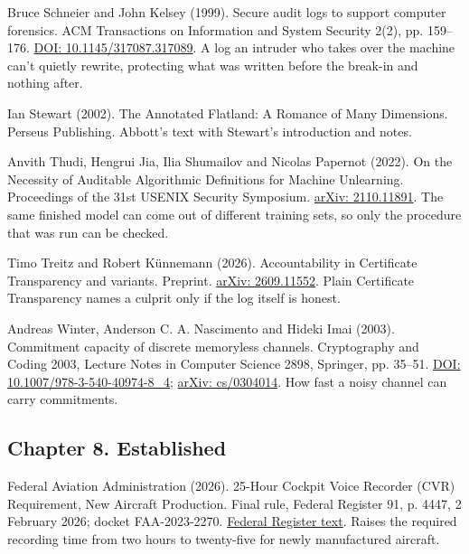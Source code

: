 \documentclass[11pt,twoside]{article}
\theoremstyle{thielethm}
\theoremstyle{thieledef}
\theoremstyle{thieledef}
\theoremstyle{thieledef}
\theoremstyle{thielethm}
\theoremstyle{thieleobs}
\theoremstyle{thielethm}
\begin{document}
\noindent Bruce Schneier and John Kelsey (1999). Secure audit logs to support computer forensics. ACM Transactions on Information and System Security 2(2), pp. 159--176. \href{https://doi.org/10.1145/317087.317089}{DOI: 10.1145/317087.317089}. A log an intruder who takes over the machine can't quietly rewrite, protecting what was written before the break-in and nothing after.
\par\medskip

\noindent Ian Stewart (2002). The Annotated Flatland: A Romance of Many Dimensions. Perseus Publishing. Abbott's text with Stewart's introduction and notes.
\par\medskip

\noindent Anvith Thudi, Hengrui Jia, Ilia Shumailov and Nicolas Papernot (2022). On the Necessity of Auditable Algorithmic Definitions for Machine Unlearning. Proceedings of the 31st USENIX Security Symposium. \href{https://arxiv.org/abs/2110.11891}{arXiv: 2110.11891}. The same finished model can come out of different training sets, so only the procedure that was run can be checked.
\par\medskip

\noindent Timo Treitz and Robert K\"unnemann (2026). Accountability in Certificate Transparency and variants. Preprint. \href{https://arxiv.org/abs/2609.11552}{arXiv: 2609.11552}. Plain Certificate Transparency names a culprit only if the log itself is honest.
\par\medskip

\noindent Andreas Winter, Anderson C. A. Nascimento and Hideki Imai (2003). Commitment capacity of discrete memoryless channels. Cryptography and Coding 2003, Lecture Notes in Computer Science 2898, Springer, pp. 35--51. \href{https://doi.org/10.1007/978-3-540-40974-8_4}{DOI: 10.1007/978-3-540-40974-8\_4}; \href{https://arxiv.org/abs/cs/0304014}{arXiv: cs/0304014}. How fast a noisy channel can carry commitments.
\par\medskip

\subsection*{Chapter 8. Established}

\noindent Federal Aviation Administration (2026). 25-Hour Cockpit Voice Recorder (CVR) Requirement, New Aircraft Production. Final rule, Federal Register 91, p. 4447, 2 February 2026; docket FAA-2023-2270. \href{https://www.govinfo.gov/content/pkg/FR-2026-02-02/html/2026-02110.htm}{Federal Register text}. Raises the required recording time from two hours to twenty-five for newly manufactured aircraft.
\par\medskip
\end{document}
